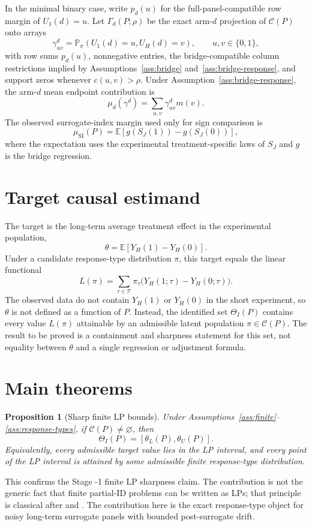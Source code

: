 \documentclass[11pt]{article}
\newcommand{\E}{\mathbb{E}}
\renewcommand{\Pr}{\mathbb{P}}
\theoremstyle{definition}
\theoremstyle{plain}
\newtheorem{proposition}{Proposition}
\theoremstyle{remark}
\begin{document}
In the minimal binary case, write \(p_d(u)\) for the full-panel-compatible row margin of \(U_1(d)=u\).  Let \(\Gamma_d(P;\rho)\) be the exact arm-\(d\) projection of \(\mathcal C(P)\) onto arrays
\[
  \gamma^d_{uv}=\Pr_\pi(U_1(d)=u,U_H(d)=v),
  \qquad u,v\in\{0,1\},
\]
with row sums \(p_d(u)\), nonnegative entries, the bridge-compatible column restrictions implied by Assumptions~\ref{ass:bridge} and~\ref{ass:bridge-response}, and support zeros whenever \(c(u,v)>\rho\).  Under Assumption~\ref{ass:bridge-response}, the arm-\(d\) mean endpoint contribution is
\[
  \mu_d(\gamma^d)=\sum_{u,v}\gamma^d_{uv}m(v).
\]
The observed surrogate-index margin used only for sign comparison is
\[
  \mu_{\mathrm{SI}}(P)=
  \E[g(S_J(1))-g(S_J(0))],
\]
where the expectation uses the experimental treatment-specific laws of \(S_J\) and \(g\) is the bridge regression.

\section{Target causal estimand}
The target is the long-term average treatment effect in the experimental population,
\[
  \theta
  =
  \E[Y_H(1)-Y_H(0)].
\]
Under a candidate response-type distribution \(\pi\), this target equals the linear functional
\[
  L(\pi)=
  \sum_{\tau\in\mathcal T}\pi_\tau
  \bigl(Y_H(1;\tau)-Y_H(0;\tau)\bigr).
\]
The observed data do not contain \(Y_H(1)\) or \(Y_H(0)\) in the short experiment, so \(\theta\) is not defined as a function of \(P\).  Instead, the identified set \(\Theta_I(P)\) contains every value \(L(\pi)\) attainable by an admissible latent population \(\pi\in\mathcal C(P)\).  The result to be proved is a containment and sharpness statement for this set, not equality between \(\theta\) and a single regression or adjustment formula.

\section{Main theorems}
\begin{proposition}[Sharp finite LP bounds]\label{prop:sharp-lp}
Under Assumptions~\ref{ass:finite}--\ref{ass:response-types}, if \(\mathcal C(P)\ne\varnothing\), then
\[
  \Theta_I(P)=[\theta_L(P),\theta_U(P)].
\]
Equivalently, every admissible target value lies in the LP interval, and every point of the LP interval is attained by some admissible finite response-type distribution.
\end{proposition}

This confirms the Stage -1 finite LP sharpness claim.  The contribution is not the generic fact that finite partial-ID problems can be written as LPs; that principle is classical after \cite{Manski1990} and \cite{BalkePearl1997}.  The contribution here is the exact response-type object for noisy long-term surrogate panels with bounded post-surrogate drift.
\end{document}
